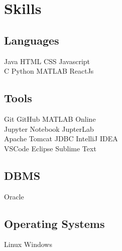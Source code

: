 \documentclass[]{deedy-resume-openfont}
\begin{document}
%
%
\lastupdated

%
%

%
%

\begin{minipage}[t]{0.33\textwidth} 


\section{Skills}
\subsection{Languages}
Java \textbullet{} HTML \textbullet{} CSS \textbullet{} Javascript \\
\textbullet{} C  \textbullet{} Python \textbullet{} MATLAB \textbullet{} ReactJs




\subsection{Tools}
Git \textbullet{} GitHub  \textbullet{} MATLAB Online  \textbullet{} \\ Jupyter Notebook \textbullet{} JupterLab \\ \textbullet{} Apache Tomcat   \textbullet{} JDBC \textbullet{} IntelliJ IDEA \\ \textbullet{} VSCode  \textbullet{} Eclipse \textbullet{} Sublime Text
\sectionsep

\subsection{DBMS}
Oracle  
\sectionsep

\subsection{Operating Systems}
Linux \textbullet{} Windows 
\sectionsep


\end{minipage}
\end{document}
